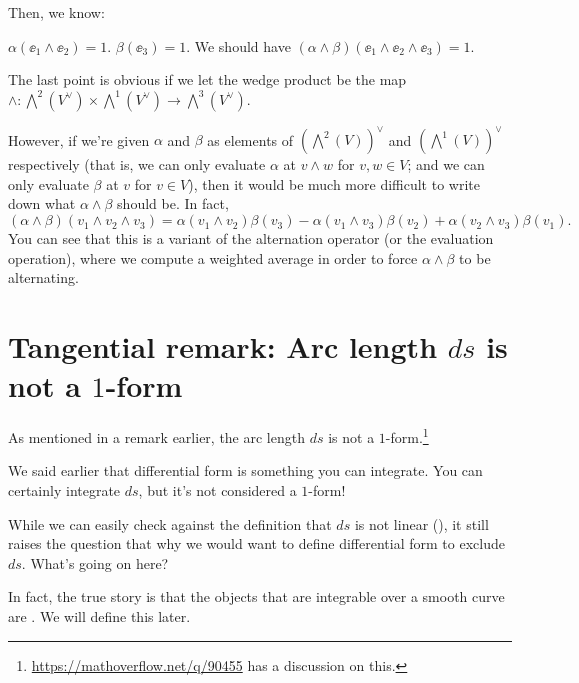 Then, we know:
\begin{itemize}
	\ii $\alpha(\ee_1 \wedge \ee_2) = 1$.
	\ii $\beta(\ee_3) = 1$.
	\ii We should have $(\alpha \wedge \beta)(\ee_1 \wedge \ee_2 \wedge \ee_3) = 1$.
\end{itemize}
The last point is obvious if we let the wedge product be the map $\wedge \colon
\bigwedge^2(V^\vee) \times \bigwedge^1(V^\vee) \to \bigwedge^3(V^\vee)$.

However, if we're given $\alpha$ and $\beta$ as elements of $(\bigwedge^2(V))^\vee$ and
$(\bigwedge^1(V))^\vee$ respectively (that is, we can only evaluate $\alpha$ at $v \wedge w$ for $v, w
\in V$; and we can only evaluate $\beta$ at $v$ for $v \in V$), then it would be much more difficult
to write down what $\alpha \wedge \beta$ should be. In fact,
\[
	(\alpha \wedge \beta)(v_1 \wedge v_2 \wedge v_3) =
	\alpha(v_1 \wedge v_2) \beta(v_3)
	- \alpha(v_1 \wedge v_3) \beta(v_2)
	+ \alpha(v_2 \wedge v_3) \beta(v_1).
\]
You can see that this is a variant of the alternation operator (or the evaluation operation),
where we compute a weighted average in order to force $\alpha \wedge \beta$ to be alternating.

\section{Tangential remark: Arc length $ds$ is not a $1$-form}
\label{sec:arc_length_not_one_form}
As mentioned in a remark earlier, the arc length $ds$ is not a
$1$-form.\footnote{\url{https://mathoverflow.net/q/90455} has a discussion on this.}

We said earlier that differential form is something you can integrate.
You can certainly integrate $ds$, but it's not considered a $1$-form!

While we can easily check against the definition that $ds$ is not linear
(), it still raises the question that why we would want to
define differential form to exclude $ds$.
What's going on here?

In fact, the true story is that the objects that are integrable over a smooth curve are
. We will define this later.

